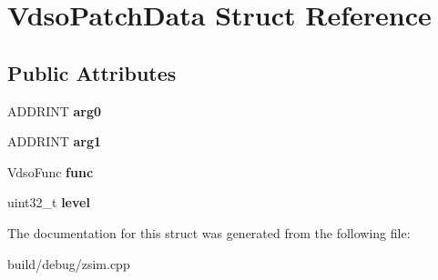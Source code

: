\hypertarget{structVdsoPatchData}{\section{Vdso\-Patch\-Data Struct Reference}
\label{structVdsoPatchData}
}
\subsection*{Public Attributes}
\begin{DoxyCompactItemize}
\item 
\hypertarget{structVdsoPatchData_a31e27ea0a198265e6af1ff67bbf5ec77}{A\-D\-D\-R\-I\-N\-T {\bfseries arg0}}\label{structVdsoPatchData_a31e27ea0a198265e6af1ff67bbf5ec77}

\item 
\hypertarget{structVdsoPatchData_aa18c148ded18a459aa9063326c940014}{A\-D\-D\-R\-I\-N\-T {\bfseries arg1}}\label{structVdsoPatchData_aa18c148ded18a459aa9063326c940014}

\item 
\hypertarget{structVdsoPatchData_ab727fc340c5b2a3c6ba885a62ad64c69}{Vdso\-Func {\bfseries func}}\label{structVdsoPatchData_ab727fc340c5b2a3c6ba885a62ad64c69}

\item 
\hypertarget{structVdsoPatchData_aac908f8efb5b0c6386b260d7b667d35f}{uint32\-\_\-t {\bfseries level}}\label{structVdsoPatchData_aac908f8efb5b0c6386b260d7b667d35f}

\end{DoxyCompactItemize}


The documentation for this struct was generated from the following file\-:\begin{DoxyCompactItemize}
\item 
build/debug/zsim.\-cpp\end{DoxyCompactItemize}
